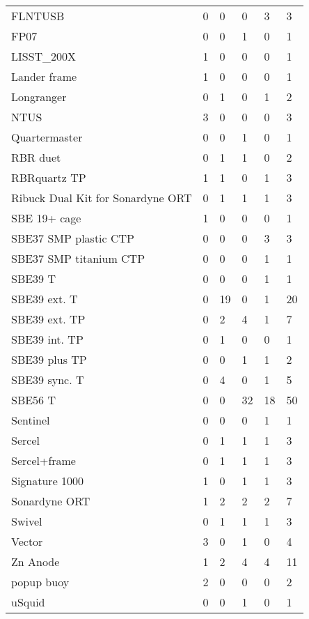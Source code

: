 \documentclass{article}
\begin{document}
\begin{table}[!htbp]
\begin{tabular}{llllll}
FLNTUSB & 0 & 0 & 0 & 3 & 3 \\
FP07 & 0 & 0 & 1 & 0 & 1 \\
LISST\_200X & 1 & 0 & 0 & 0 & 1 \\
Lander frame & 1 & 0 & 0 & 0 & 1 \\
Longranger & 0 & 1 & 0 & 1 & 2 \\
NTUS & 3 & 0 & 0 & 0 & 3 \\
Quartermaster & 0 & 0 & 1 & 0 & 1 \\
RBR duet & 0 & 1 & 1 & 0 & 2 \\
RBRquartz TP & 1 & 1 & 0 & 1 & 3 \\
Ribuck Dual Kit for Sonardyne ORT & 0 & 1 & 1 & 1 & 3 \\
SBE 19+ cage & 1 & 0 & 0 & 0 & 1 \\
SBE37 SMP plastic CTP & 0 & 0 & 0 & 3 & 3 \\
SBE37 SMP titanium CTP & 0 & 0 & 0 & 1 & 1 \\
SBE39 T & 0 & 0 & 0 & 1 & 1 \\
SBE39 ext. T & 0 & 19 & 0 & 1 & 20 \\
SBE39 ext. TP & 0 & 2 & 4 & 1 & 7 \\
SBE39 int. TP & 0 & 1 & 0 & 0 & 1 \\
SBE39 plus TP & 0 & 0 & 1 & 1 & 2 \\
SBE39 sync. T & 0 & 4 & 0 & 1 & 5 \\
SBE56 T & 0 & 0 & 32 & 18 & 50 \\
Sentinel & 0 & 0 & 0 & 1 & 1 \\
Sercel & 0 & 1 & 1 & 1 & 3 \\
Sercel+frame & 0 & 1 & 1 & 1 & 3 \\
Signature 1000 & 1 & 0 & 1 & 1 & 3 \\
Sonardyne ORT & 1 & 2 & 2 & 2 & 7 \\
Swivel & 0 & 1 & 1 & 1 & 3 \\
Vector & 3 & 0 & 1 & 0 & 4 \\
Zn Anode & 1 & 2 & 4 & 4 & 11 \\
popup buoy & 2 & 0 & 0 & 0 & 2 \\
uSquid & 0 & 0 & 1 & 0 & 1 \\
\bottomrule
\end{tabular}
\end{table}
\end{document}
